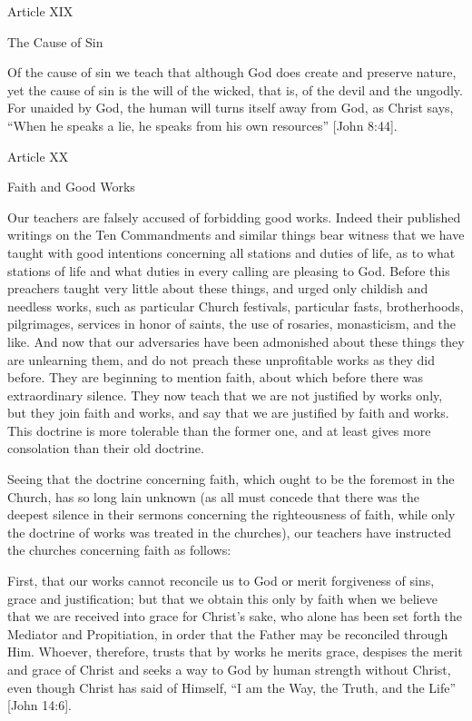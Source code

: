  

Article XIX

The Cause of Sin

Of the cause of sin we teach that although God does create and preserve nature, yet the cause of sin is the will of the wicked, that is, of the devil and the ungodly. For unaided by God, the human will turns itself away from God, as Christ says, “When he speaks a lie, he speaks from his own resources” [John 8:44].

 

Article XX

Faith and Good Works

Our teachers are falsely accused of forbidding good works. Indeed their published writings on the Ten Commandments and similar things bear witness that we have taught with good intentions concerning all stations and duties of life, as to what stations of life and what duties in every calling are pleasing to God. Before this preachers taught very little about these things, and urged only childish and needless works, such as particular Church festivals, particular fasts, brotherhoods, pilgrimages, services in honor of saints, the use of rosaries, monasticism, and the like. And now that our adversaries have been admonished about these things they are unlearning them, and do not preach these unprofitable works as they did before. They are beginning to mention faith, about which before there was extraordinary silence. They now teach that we are not justified by works only, but they join faith and works, and say that we are justified by faith and works. This doctrine is more tolerable than the former one, and at least gives more consolation than their old doctrine.

Seeing that the doctrine concerning faith, which ought to be the foremost in the Church, has so long lain unknown (as all must concede that there was the deepest silence in their sermons concerning the righteousness of faith, while only the doctrine of works was treated in the churches), our teachers have instructed the churches concerning faith as follows:

First, that our works cannot reconcile us to God or merit forgiveness of sins, grace and justification; but that we obtain this only by faith when we believe that we are received into grace for Christ’s sake, who alone has been set forth the Mediator and Propitiation, in order that the Father may be reconciled through Him. Whoever, therefore, trusts that by works he merits grace, despises the merit and grace of Christ and seeks a way to God by human strength without Christ, even though Christ has said of Himself, “I am the Way, the Truth, and the Life” [John 14:6].

